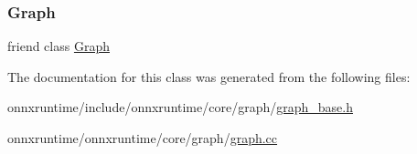 \subsubsection{\texorpdfstring{Graph}{Graph}}
{\footnotesize\ttfamily friend class \mbox{\hyperlink{classonnxruntime_1_1Graph}{Graph}}\hspace{0.3cm}{\ttfamily [friend]}}



The documentation for this class was generated from the following files\+:\begin{DoxyCompactItemize}
\item 
onnxruntime/include/onnxruntime/core/graph/\mbox{\hyperlink{graph__base_8h}{graph\+\_\+base.\+h}}\item 
onnxruntime/onnxruntime/core/graph/\mbox{\hyperlink{graph_8cc}{graph.\+cc}}\end{DoxyCompactItemize}
